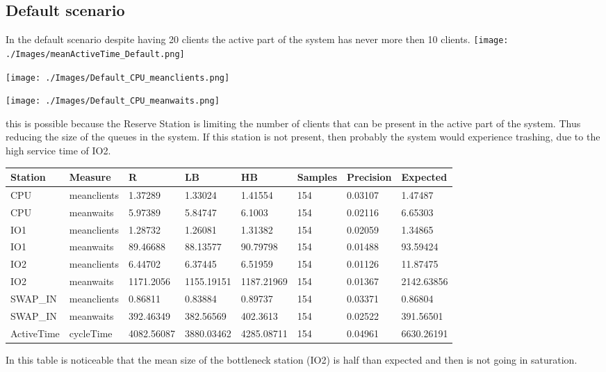 \documentclass[12pt,a4paper]{article}
\begin{document}
\subsection{Default scenario}
In the default scenario despite having 20 clients the active part of the system has never more then 10 clients.
\texttt{[image: ./Images/meanActiveTime\_Default.png]}

\texttt{[image: ./Images/Default\_CPU\_meanclients.png]}

\texttt{[image: ./Images/Default\_CPU\_meanwaits.png]}

this is possible because the Reserve Station is limiting the number of clients that can be present in the active part of the system. Thus reducing the size of the queues in the system. If this station is not present, then probably the system would experience trashing, due to the high service time of IO2.

\begin{table}[!ht]
    \centering
    \begin{tabular}{|l|l|l|l|l|l|l|l|}
    \hline
        Station & Measure & R & LB & HB & Samples & Precision & Expected \\ \hline
        CPU & meanclients & 1.37289 & 1.33024 & 1.41554 & 154 & 0.03107 & 1.47487 \\ \hline
        CPU & meanwaits & 5.97389 & 5.84747 & 6.1003 & 154 & 0.02116 & 6.65303 \\ \hline
        IO1 & meanclients & 1.28732 & 1.26081 & 1.31382 & 154 & 0.02059 & 1.34865 \\ \hline
        IO1 & meanwaits & 89.46688 & 88.13577 & 90.79798 & 154 & 0.01488 & 93.59424 \\ \hline
        IO2 & meanclients & 6.44702 & 6.37445 & 6.51959 & 154 & 0.01126 & 11.87475 \\ \hline
        IO2 & meanwaits & 1171.2056 & 1155.19151 & 1187.21969 & 154 & 0.01367 & 2142.63856 \\ \hline
        SWAP\_IN & meanclients & 0.86811 & 0.83884 & 0.89737 & 154 & 0.03371 & 0.86804 \\ \hline
        SWAP\_IN & meanwaits & 392.46349 & 382.56569 & 402.3613 & 154 & 0.02522 & 391.56501 \\ \hline
        ActiveTime & cycleTime & 4082.56087 & 3880.03462 & 4285.08711 & 154 & 0.04961 & 6630.26191 \\ \hline
    \end{tabular}
\end{table}
In this table is noticeable that the mean size of the bottleneck station (IO2) is half than expected and then is not going in saturation. 
\end{document}
